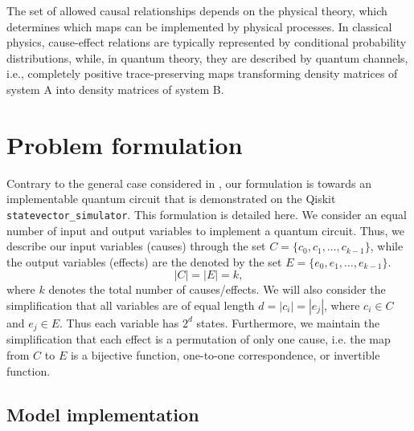 \documentclass[%
 aps,
 jmp,%
 amsmath,amssymb,
 reprint,%
]{revtex4-2}
\begin{document}
The set of allowed causal relationships depends on the physical theory, which determines which maps can be implemented by physical processes.
In classical physics, cause-effect relations are typically represented by conditional probability distributions, while, in quantum theory, they are described by quantum channels, i.e., completely positive trace-preserving maps transforming density matrices of system A into density matrices of system B.

\section{Problem formulation}\label{sec:prob-formulation}
Contrary to the general case considered in \cite{chiribella2019quantum}, our formulation is towards an implementable quantum circuit that is demonstrated on the Qiskit \texttt{statevector\_simulator}. 
This formulation is detailed here. We consider an equal number of input and output variables to implement a quantum circuit. 
Thus, we describe our input variables (causes) through the set $C = \{c_0, c_1,\dots, c_{k-1}\}$, while the output variables (effects) are the denoted by the set $E = \{e_0, e_1,\dots, e_{k-1}\}$.
\begin{equation}
|C| = |E| = k,
\end{equation}
where $k$ denotes the total number of causes/effects. We will also consider the simplification that all variables are of equal length $d = |c_i| = |e_j|$, where $c_i \in C$ and $e_j \in E$.
Thus each variable has $2^d$ states. Furthermore, we maintain the simplification that each effect is a permutation of only one cause, i.e. the map from $C$ to $E$ is a bijective function, one-to-one correspondence, or invertible function.

\subsection{Model implementation}
\end{document}
